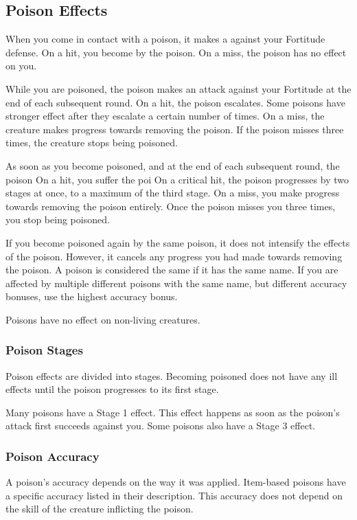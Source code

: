   \subsection{Poison Effects}\label{Poison Effects}
    When you come in contact with a poison, it makes a  against your Fortitude defense.
    On a hit, you become  by the poison.
    On a miss, the poison has no effect on you.

    While you are poisoned, the poison makes an attack against your Fortitude at the end of each subsequent round.
    On a hit, the poison escalates.
    Some poisons have stronger effect after they escalate a certain number of times.
    On a miss, the creature makes progress towards removing the poison.
    If the poison misses three times, the creature stops being poisoned.

    As soon as you become poisoned, and at the end of each subsequent round, the poison 
    On a hit, you suffer the poi
    On a critical hit, the poison progresses by two stages at once, to a maximum of the third stage.
    On a miss, you make progress towards removing the poison entirely.
    Once the poison misses you three times, you stop being poisoned.

    If you become poisoned again by the same poison, it does not intensify the effects of the poison.
    However, it cancels any progress you had made towards removing the poison.
    A poison is considered the same if it has the same name.
    If you are affected by multiple different poisons with the same name, but different accuracy bonuses, use the highest accuracy bonus.

    Poisons have no effect on non-living creatures.

    \subsubsection{Poison Stages}
      Poison effects are divided into stages.
      Becoming poisoned does not have any ill effects until the poison progresses to its first stage.

      Many poisons have a Stage 1 effect.
      This effect happens as soon as the poison's attack first succeeds against you.
      Some poisons also have a Stage 3 effect.

    \subsubsection{Poison Accuracy}
      A poison's accuracy depends on the way it was applied.
      Item-based poisons have a specific accuracy listed in their description.
      This accuracy does not depend on the skill of the creature inflicting the poison.

